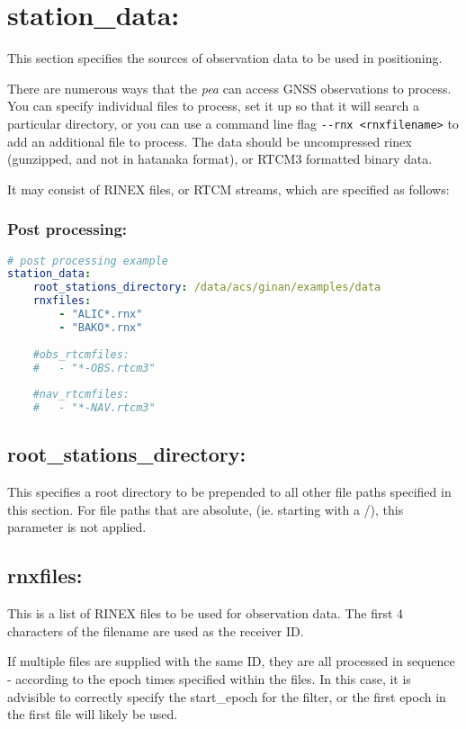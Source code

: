 \section{station\_data:}
This section specifies the sources of observation data to be used in positioning.


There are numerous ways that the \emph{pea} can access GNSS observations to process. 
You can specify individual files to process, set it up so that it will search a particular directory, or you can use a command line flag \lstinline{--rnx <rnxfilename>} to add an additional file to process. 
The data should be uncompressed rinex (gunzipped, and not in hatanaka format), or RTCM3 formatted binary data.


It may consist of RINEX files, or RTCM streams, which are specified as follows:
\subsubsection{Post processing:}

\begin{lstlisting}[language=yaml,caption=station\_data:]
# post processing example
station_data:
	root_stations_directory: /data/acs/ginan/examples/data
	rnxfiles:
		- "ALIC*.rnx"
		- "BAKO*.rnx"
		
	#obs_rtcmfiles:
	#	- "*-OBS.rtcm3"
		
	#nav_rtcmfiles:
	#	- "*-NAV.rtcm3"
\end{lstlisting}


\subsection*{root\_stations\_directory:}
This specifies a root directory to be prepended to all other file paths specified in this section. For file paths that are absolute, (ie. starting with a /), this parameter is not applied.

\subsection*{rnxfiles:}
This is a list of RINEX files to be used for observation data. The first 4 characters of the filename are used as the receiver ID.

If multiple files are supplied with the same ID, they are all processed in sequence - according to the epoch times specified within the files. In this case, it is advisible to correctly specify the start\_epoch for the filter, or the first epoch in the first file will likely be used.

